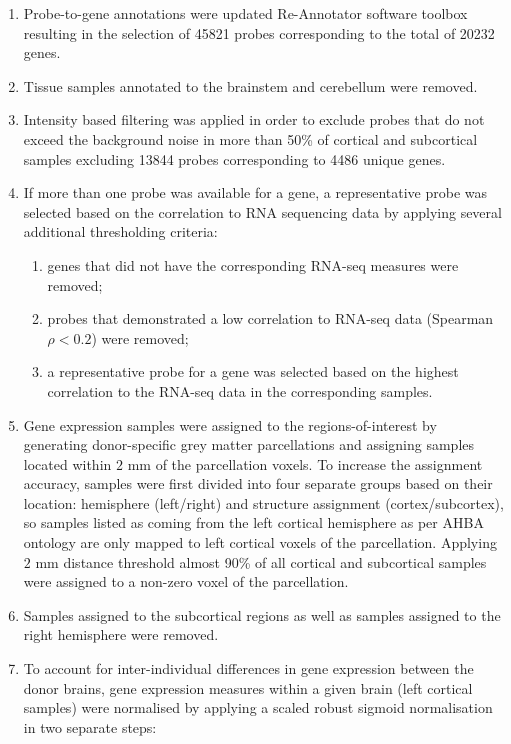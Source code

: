 \begin{enumerate}\addtocounter{enumii}{5}%
      \item Probe-to-gene annotations were updated Re-Annotator software toolbox \citep{Arloth2015} resulting in the selection of \num{45821} probes corresponding to the total of \num{20232} genes.
      \item Tissue samples annotated to the brainstem and cerebellum were removed.
      \item Intensity based filtering was applied in order to exclude probes that do not exceed the background noise in more than 50\% of cortical and subcortical samples excluding \num{13844} probes corresponding to \num{4486} unique genes.
      \item If more than one probe was available for a gene, a representative probe was selected based on the correlation to RNA sequencing data \citep{Miller2014a} by applying several additional thresholding criteria:
      \begin{enumerate}
      \item genes that did not have the corresponding RNA-seq measures were removed;
      \item probes that demonstrated a low correlation to RNA-seq data (Spearman $\rho<0.2$) were removed;
	  \item a representative probe for a gene was selected based on the highest correlation to the RNA-seq data in the corresponding samples.
      \end{enumerate}
      \item Gene expression samples were assigned to the regions-of-interest by generating donor-specific grey matter parcellations and assigning samples located within $2$ mm of the parcellation voxels. To increase the assignment accuracy, samples were first divided into four separate groups based on their location: hemisphere (left/right) and structure assignment (cortex/subcortex), so samples listed as coming from the left cortical hemisphere as per AHBA ontology are only mapped to left cortical voxels of the parcellation. Applying $2$ mm distance threshold almost 90\% of all cortical and subcortical samples were assigned to a non-zero voxel of the parcellation.
      \item Samples assigned to the subcortical regions as well as samples assigned to the right hemisphere were removed.
      \item To account for inter-individual differences in gene expression between the donor brains, gene expression measures within a given brain (left cortical samples) were normalised by applying a scaled robust sigmoid normalisation \citep{Arnatkeviciute2019} in two separate steps:

\end{enumerate}
